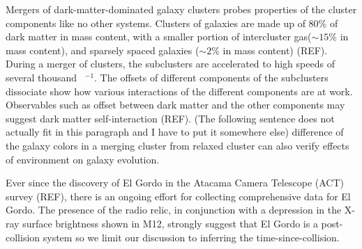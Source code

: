 

Mergers of dark-matter-dominated galaxy clusters probes properties
of the cluster components like no other systems. 
Clusters of galaxies are made up of 80\% of dark matter in mass content, 
with a smaller  portion of intercluster gas($\sim 15\%$ in mass content), and
sparsely spaced galaxies ($\sim 2\%$ in mass content) (REF). During a merger of
clusters, the subclusters are accelerated to high speeds of several
thousand \kilo \meter~\second$^{-1}$. The offsets of different components
of the subclusters dissociate show how various interactions of the different
components are at work. Observables such as offset between dark
matter and the other components may suggest dark matter self-interaction
(REF).  (The following sentence does not actually fit in this paragraph and
I have to put it somewhere else) difference of the galaxy colors in a merging cluster from relaxed cluster can also verify effects of environment on galaxy evolution.\par

Ever since the discovery of El Gordo in the Atacama Camera Telescope (ACT)
survey (REF), there is an ongoing effort for collecting comprehensive data
for El Gordo.
The presence of the radio relic, in
conjunction with a depression in the X-ray surface brightness shown in M12,
strongly suggest that El Gordo is a post-collision system so we limit our
discussion to inferring the time-since-collision. 

